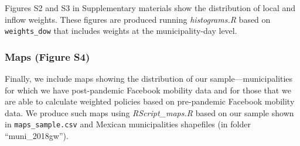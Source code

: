 \documentclass{article}
\begin{document}
Figures S2 and S3 in Supplementary materials show the distribution of local and inflow weights. These figures are produced running \textit{histograms.R} based on \texttt{weights\_dow} that includes weights at the municipality-day level.

\subsubsection*{Maps (Figure S4)}

Finally, we include maps showing the distribution of our sample---municipalities for which we have post-pandemic Facebook mobility data and for those that we are able to calculate weighted policies based on pre-pandemic Facebook mobility data. We produce such maps using \textit{RScript\_maps.R} based on our sample shown in \texttt{maps\_sample.csv} and Mexican municipalities shapefiles (in folder ``muni\_2018gw'').
\end{document}
